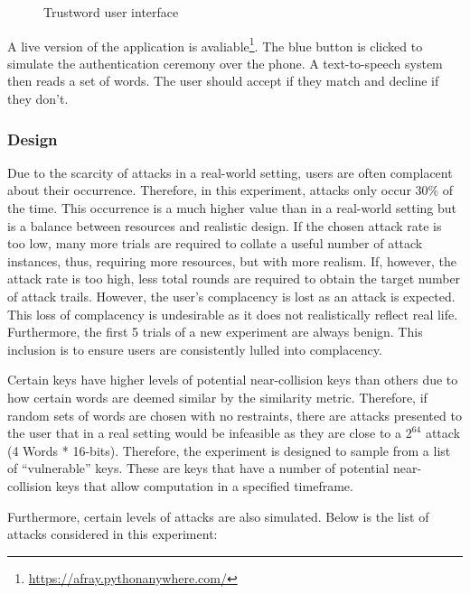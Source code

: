 \begin{figure}[h!]
    \centering
    \begin{adjustbox}{width=0.4\textwidth,center}
    \end{adjustbox}
    \caption{Trustword user interface}
    \label{fig:trustwordUI}
\end{figure}


A live version of the application is avaliable\footnote{\url{https://afray.pythonanywhere.com/}}. The blue button is clicked to simulate the authentication ceremony over the phone. A text-to-speech system then reads a set of words. The user should accept if they match and decline if they don't.

\subsubsection*{Design}

Due to the scarcity of attacks in a real-world setting, users are often complacent about their occurrence. Therefore, in this experiment, attacks only occur 30\% of the time. This occurrence is a much higher value than in a real-world setting but is a balance between resources and realistic design. If the chosen attack rate is too low, many more trials are required to collate a useful number of attack instances, thus, requiring more resources, but with more realism. If, however, the attack rate is too high, less total rounds are required to obtain the target number of attack trails. However, the user's complacency is lost as an attack is expected. This loss of complacency is undesirable as it does not realistically reflect real life. Furthermore, the first 5 trials of a new experiment are always benign. This inclusion is to ensure users are consistently lulled into complacency.

Certain keys have higher levels of potential near-collision keys than others due to how certain words are deemed similar by the similarity metric. Therefore, if random sets of words are chosen with no restraints, there are attacks presented to the user that in a real setting would be infeasible as they are close to a $2^{64}$ attack (4 Words * 16-bits). Therefore, the experiment is designed to sample from a list of ``vulnerable'' keys. These are keys that have a number of potential near-collision keys that allow computation in a specified timeframe. 

Furthermore, certain levels of attacks are also simulated. Below is the list of attacks considered in this experiment: 


